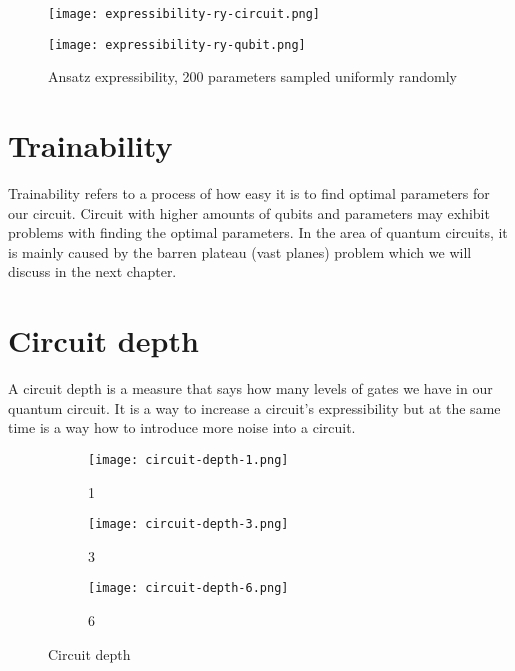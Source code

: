 \begin{figure}[H]
    \centering
    \begin{minipage}{0.4\linewidth}
        \centering
        \texttt{[image: expressibility-ry-circuit.png]}
    \end{minipage}
    \begin{minipage}{0.4\linewidth}
        \centering
        \texttt{[image: expressibility-ry-qubit.png]}
    \end{minipage}
    \caption{Ansatz expressibility, 200 parameters sampled uniformly randomly}
\end{figure}

\section{Trainability}
Trainability refers to a process of how easy it is to find optimal parameters for our circuit. Circuit with higher amounts of qubits and parameters may exhibit problems with finding the optimal parameters. In the area of quantum circuits, it is mainly caused by the barren plateau (vast planes) problem which we will discuss in the next chapter.

\section{Circuit depth}
A circuit depth is a measure that says how many levels of gates we have in our quantum circuit. It is a way to increase a circuit's expressibility but at the same time is a way how to introduce more noise into a circuit. 

\begin{figure}[H]
    \centering
    \begin{subfigure}[b]{0.2\textwidth}
        \centering
        \texttt{[image: circuit-depth-1.png]} 
        \caption*{1}
    \end{subfigure}
    \hfill
    \begin{subfigure}[b]{0.3\textwidth}
        \centering
        \texttt{[image: circuit-depth-3.png]}
        \caption*{3}
    \end{subfigure}
    \hfill
    \begin{subfigure}[b]{0.45\textwidth}
        \centering
        \texttt{[image: circuit-depth-6.png]}
        \caption*{6}
    \end{subfigure}
       \caption{Circuit depth}
       \label{fig:circuit-depth}
\end{figure}

